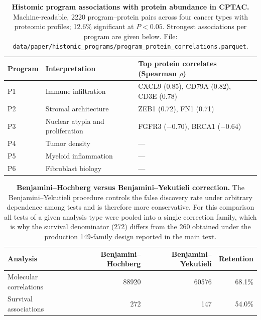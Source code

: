 \documentclass[11pt]{article}
\begin{document}
\begin{table}[htbp]
\centering
\caption{\textbf{Histomic program associations with protein abundance in
CPTAC.} Machine-readable, \num{2220} program--protein pairs across four cancer
types with proteomic profiles; 12.6\% significant at $P < 0.05$. Strongest
associations per program are given below.
File: \texttt{data/paper/histomic\_programs/program\_protein\_correlations.parquet}.}
\label{tab:s10}
\small
\begin{tabular}{llll}
\toprule
Program & Interpretation & Top protein correlates (Spearman $\rho$) \\
\midrule
P1 & Immune infiltration & CXCL9 (0.85), CD79A (0.82), CD3E (0.78) \\
P2 & Stromal architecture & ZEB1 (0.72), FN1 (0.71) \\
P3 & Nuclear atypia and proliferation & FGFR3 ($-0.70$), BRCA1 ($-0.64$) \\
P4 & Tumor density & --- \\
P5 & Myeloid inflammation & --- \\
P6 & Fibroblast biology & --- \\
\bottomrule
\end{tabular}
\end{table}

\begin{table}[htbp]
\centering
\caption{\textbf{Benjamini--Hochberg versus Benjamini--Yekutieli correction.}
The Benjamini--Yekutieli procedure controls the false discovery rate under
arbitrary dependence among tests and is therefore more conservative. For this
comparison all tests of a given analysis type were pooled into a single
correction family, which is why the survival denominator (272) differs from the
260 obtained under the production 149-family design reported in the main text.}
\label{tab:s11}
\small
\begin{tabular}{lrrr}
\toprule
Analysis & Benjamini--Hochberg & Benjamini--Yekutieli & Retention \\
\midrule
Molecular correlations & \num{88920} & \num{60576} & 68.1\% \\
Survival associations & 272 & 147 & 54.0\% \\
\bottomrule
\end{tabular}
\end{table}
\end{document}
